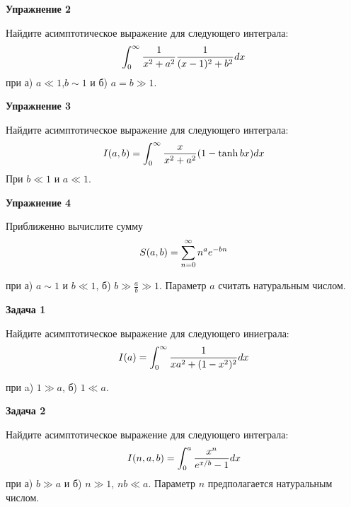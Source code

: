 \documentclass[a4paper,12pt]{article}
\begin{document}
\vspace{15pt}
\noindent \textbf{Упражнение 2}

\noindent Найдите асимптотическое выражение для следующего интеграла:
\begin{equation}\notag
\int_{0}^{\infty}\frac{1}{x^{2}+a^{2}}\frac{1}{(x-1)^{2}+b^{2}}dx
\end{equation}
\noindent при а) $a\ll 1$,\quad $b\sim 1$ и б) $a=b\gg1$.

\vspace{15pt}
\noindent \textbf{Упражнение 3}

\noindent Найдите асимптотическое выражение для следующего интеграла:
\begin{equation}\notag
I(a,b)	=\int_{0}^{\infty}\frac{x}{x^{2}+a^{2}}(1-\tanh bx)dx
\end{equation}
\noindent При $b\ll 1$ и $a\ll 1$.

\vspace{15pt}
\noindent \textbf{Упражнение 4}

\noindent Приближенно вычислите сумму
\begin{equation}\notag
S(a,b)	=\sum_{n=0}^{\infty}n^{a}e^{-bn}
\end{equation}

\noindent при а) $a\sim 1$ и $b\ll 1$, б) $b\gg\frac{a}{b}\gg 1$. Параметр $a$ считать натуральным числом.

\vspace{15pt}
\noindent \textbf{Задача 1}

\noindent Найдите асимптотическое выражение для следующего иниеграла:
\begin{equation}
\notag
I(a)=\int_{0}^{\infty}\frac{1}{xa^{2}+(1-x^{2})^{2}}dx	
\end{equation}

\noindent при a) $1\gg a$, б) $1\ll a$.

\vspace{15pt}
\noindent \textbf{Задача 2}

\noindent Найдите асимптотическое выражение для следующего интеграла:
\begin{equation}\notag
I(n,a,b)	=\int_{0}^{a}\frac{x^{n}}{e^{x/b}-1}dx
\end{equation}
\noindent при а) $b\gg a$ и б) $n\gg 1$, $nb\ll a$. Параметр $n$ предполагается натуральным числом.
\end{document}
